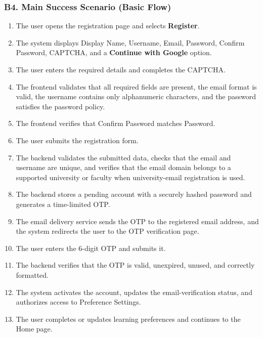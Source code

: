 \documentclass[12pt]{article}
\begin{document}
\hypertarget{sec:b4-main-success-scenario-basic-flow}{}
\subsubsection*{B4. Main Success Scenario (Basic Flow)}
\par\medskip

\begin{enumerate}
\item The user opens the registration page and selects \textbf{Register}.
\item The system displays Display Name, Username, Email, Password, Confirm Password, CAPTCHA, and a \textbf{Continue with Google} option.
\item The user enters the required details and completes the CAPTCHA.
\item The frontend validates that all required fields are present, the email format is valid, the username contains only alphanumeric characters, and the password satisfies the password policy.
\item The frontend verifies that Confirm Password matches Password.
\item The user submits the registration form.
\item The backend validates the submitted data, checks that the email and username are unique, and verifies that the email domain belongs to a supported university or faculty when university-email registration is used.
\item The backend stores a pending account with a securely hashed password and generates a time-limited OTP.
\item The email delivery service sends the OTP to the registered email address, and the system redirects the user to the OTP verification page.
\item The user enters the 6-digit OTP and submits it.
\item The backend verifies that the OTP is valid, unexpired, unused, and correctly formatted.
\item The system activates the account, updates the email-verification status, and authorizes access to Preference Settings.
\item The user completes or updates learning preferences and continues to the Home page.
\end{enumerate}
\par\medskip

\hypertarget{sec:b5-alternative-flows}{}
\end{document}
